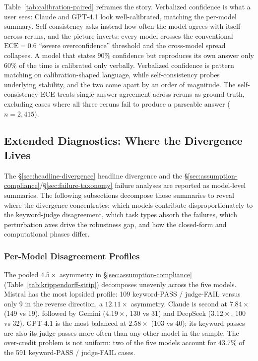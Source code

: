 Table~\ref{tab:calibration-paired} reframes the story. Verbalized
confidence is what a user sees: Claude and GPT-4.1 look
well-calibrated, matching the per-model summary. Self-consistency
asks instead how often the model agrees with itself across reruns,
and the picture inverts: every model crosses the conventional
$\text{ECE} = 0.6$ ``severe overconfidence'' threshold and the
cross-model spread collapses. A model that states $90\%$ confidence
but reproduces its own answer only $60\%$ of the time is calibrated
only verbally. Verbalized confidence is pattern matching on
calibration-shaped language, while self-consistency probes underlying
stability, and the two come apart by an order of magnitude. The
self-consistency ECE treats single-answer agreement across reruns
as ground truth, excluding cases where all three reruns fail to
produce a parseable answer ($n = 2{,}415$).

\subsection{Extended Diagnostics: Where the Divergence Lives}
\label{sec:extended-diagnostics}

The \S\ref{sec:headline-divergence} headline divergence and the
\S\ref{sec:assumption-compliance}/\S\ref{sec:failure-taxonomy}
failure analyses are reported as model-level summaries. The
following subsections decompose those summaries to reveal where the
divergence concentrates: which models contribute disproportionately
to the keyword-judge disagreement, which task types absorb the
failures, which perturbation axes drive the robustness gap, and how
the closed-form and computational phases differ.

\subsubsection{Per-Model Disagreement Profiles}
\label{sec:per-model-disagreement}

The pooled $4.5\times$ asymmetry in \S\ref{sec:assumption-compliance}
(Table~\ref{tab:krippendorff-strip}) decomposes unevenly across the
five models. Mistral has the most lopsided profile: 109 keyword-PASS
/ judge-FAIL versus only 9 in the reverse direction, a $12.11\times$
asymmetry. Claude is second at $7.84\times$ (149 vs 19), followed
by Gemini ($4.19\times$, 130 vs 31) and DeepSeek ($3.12\times$,
100 vs 32). GPT-4.1 is the most balanced at $2.58\times$ (103 vs
40); its keyword passes are also its judge passes more often than
any other model in the sample. The over-credit problem is not
uniform: two of the five models account for $43.7\%$ of the 591
keyword-PASS / judge-FAIL cases.

